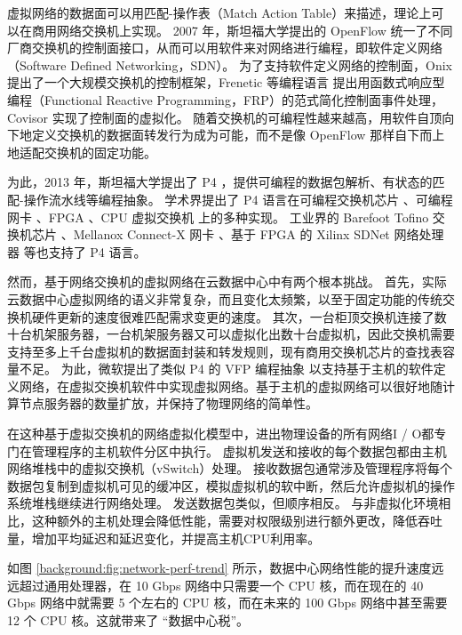 虚拟网络的数据面可以用匹配-操作表（Match Action Table）来描述，理论上可以在商用网络交换机上实现。
2007 年，斯坦福大学提出的 OpenFlow \cite{mckeown2008openflow} 统一了不同厂商交换机的控制面接口，从而可以用软件来对网络进行编程，即软件定义网络（Software Defined Networking，SDN）。
为了支持软件定义网络的控制面，Onix \cite{koponen2010onix} 提出了一个大规模交换机的控制框架，Frenetic 等编程语言 \cite{voellmy2010nettle,foster2011frenetic} 提出用函数式响应型编程（Functional Reactive Programming，FRP）的范式简化控制面事件处理，Covisor \cite{jin2015covisor} 实现了控制面的虚拟化。
随着交换机的可编程性越来越高，用软件自顶向下地定义交换机的数据面转发行为成为可能，而不是像 OpenFlow 那样自下而上地适配交换机的固定功能。

为此，2013 年，斯坦福大学提出了 P4 \cite{bosshart2014p4}，提供可编程的数据包解析、有状态的匹配-操作流水线等编程抽象。
学术界提出了 P4 语言在可编程交换机芯片 \cite{bosshart2013forwarding}、可编程网卡 \cite{kaufmann2016high}、FPGA \cite{wang2017p4fpga}、CPU 虚拟交换机 \cite{shahbaz2016pisces} 上的多种实现。
工业界的 Barefoot Tofino 交换机芯片 \cite{barefoot-tofino}、Mellanox Connect-X 网卡 \cite{mellanox}、基于 FPGA 的 Xilinx SDNet 网络处理器 \cite{xilinx-p4} 等也支持了 P4 语言。

然而，基于网络交换机的虚拟网络在云数据中心中有两个根本挑战。
首先，实际云数据中心虚拟网络的语义非常复杂，而且变化太频繁，以至于固定功能的传统交换机硬件更新的速度很难匹配需求变更的速度。
其次，一台柜顶交换机连接了数十台机架服务器，一台机架服务器又可以虚拟化出数十台虚拟机，因此交换机需要支持至多上千台虚拟机的数据面封装和转发规则，现有商用交换机芯片的查找表容量不足。
为此，微软提出了类似 P4 的 VFP 编程抽象 \cite{firestone2017vfp} 以支持基于主机的软件定义网络，在虚拟交换机软件中实现虚拟网络。基于主机的虚拟网络可以很好地随计算节点服务器的数量扩放，并保持了物理网络的简单性。

在这种基于虚拟交换机的网络虚拟化模型中，进出物理设备的所有网络I / O都专门在管理程序的主机软件分区中执行。 虚拟机发送和接收的每个数据包都由主机网络堆栈中的虚拟交换机（vSwitch）处理。 接收数据包通常涉及管理程序将每个数据包复制到虚拟机可见的缓冲区，模拟虚拟机的软中断，然后允许虚拟机的操作系统堆栈继续进行网络处理。 发送数据包类似，但顺序相反。 与非虚拟化环境相比，这种额外的主机处理会降低性能，需要对权限级别进行额外更改，降低吞吐量，增加平均延迟和延迟变化，并提高主机CPU利用率。

如图 \ref{background:fig:network-perf-trend} 所示，数据中心网络性能的提升速度远远超过通用处理器，在 10 Gbps 网络中只需要一个 CPU 核，而在现在的 40 Gbps 网络中就需要 5 个左右的 CPU 核，而在未来的 100 Gbps 网络中甚至需要 12 个 CPU 核。这就带来了 ``数据中心税''。

